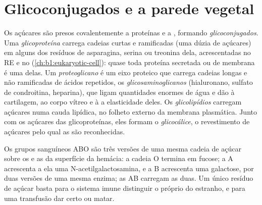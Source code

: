 \section{Glicoconjugados e a parede vegetal}

\begin{definition}\label{def:b1:carbohydrates:glycoconjugate}
Os açúcares são presos covalentemente a proteínas e a , formando
\emph{glicoconjugados}. Uma
\emph{glicoproteína} carrega cadeias curtas e
ramificadas (uma dúzia de açúcares) em alguns dos resíduos de
asparagina, serina ou treonina dela, acrescentadas no RE e no 
(\cref{ch:b1:eukaryotic-cell}): quase toda proteína secretada ou de
membrana é uma delas. Um \emph{proteoglicano} é um
eixo proteico que carrega cadeias longas e não ramificadas de
 ácidos repetidos, os
\emph{glicosaminoglicanos} (hialuronano,
sulfato de condroitina, heparina), que ligam quantidades enormes de água
e dão à cartilagem, ao corpo vítreo e à  a
elasticidade deles. Os \emph{glicolipídios}
carregam açúcares numa cauda lipídica, no folheto externo da membrana
plasmática. Junto com os açúcares das glicoproteínas, eles formam o
\emph{glicocálice}, o revestimento de açúcares pelo
qual as  são reconhecidas.
\end{definition}

\begin{example}\label{ex:b1:carbohydrates:abo}
Os grupos sanguíneos ABO são três versões de uma mesma cadeia de açúcar
sobre os  e as  da superfície da hemácia: a
cadeia O termina em fucose; a A acrescenta a ela uma
N-acetilgalactosamina, e a B acrescenta uma galactose, por duas versões
de uma mesma enzima; as  AB carregam as duas. Um único resíduo de
açúcar basta para o sistema imune distinguir o próprio do estranho, e
para uma transfusão dar certo ou matar.
\end{example}

